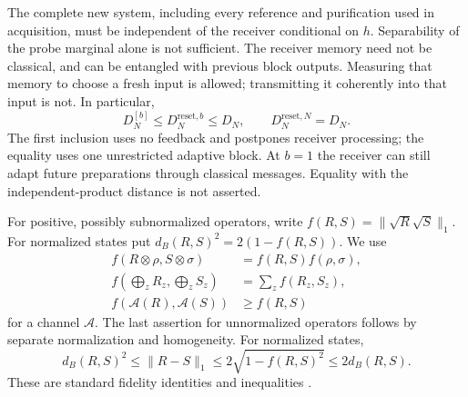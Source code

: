 The complete new system, including every reference and purification
used in acquisition, must be independent of the receiver conditional
on $h$.  Separability of the probe marginal alone is not sufficient.
The receiver memory need not be classical, and can be entangled with
previous block outputs.  Measuring that memory to choose a fresh
input is allowed; transmitting it coherently into that input is not.
In particular,
\begin{equation}\label{eq:resetinclusions88}
 D_N^{[b]}\le D_N^{\mathrm{reset},b}\le D_N,
 \qquad D_N^{\mathrm{reset},N}=D_N.
\end{equation}
The first inclusion uses no feedback and postpones receiver processing;
the equality uses one unrestricted adaptive block.  At $b=1$ the
receiver can still adapt future preparations through classical
messages.  Equality with the independent-product distance is not
asserted.

For positive, possibly subnormalized operators, write
$f(R,S)=\|\sqrt R\sqrt S\|_1$.  For normalized states put
$d_B(R,S)^2=2(1-f(R,S))$.  We use
\begin{equation}\label{eq:rootrules88}
\begin{split}
 f(R\otimes\rho,S\otimes\sigma)&=f(R,S)f(\rho,\sigma),\\
 f\left(\bigoplus_zR_z,\bigoplus_zS_z\right)&=\sum_z f(R_z,S_z),\\
 f(\mathcal A(R),\mathcal A(S))&\ge f(R,S)
\end{split}
\end{equation}
for a channel $\mathcal A$.  The last assertion for unnormalized
operators follows by separate normalization and homogeneity.
For normalized states,
\begin{equation}\label{eq:tracebures88}
 d_B(R,S)^2\le\|R-S\|_1
 \le2\sqrt{1-f(R,S)^2}\le2d_B(R,S).
\end{equation}
These are standard fidelity identities and inequalities
\cite[Chapter~3]{Watrous65}.

